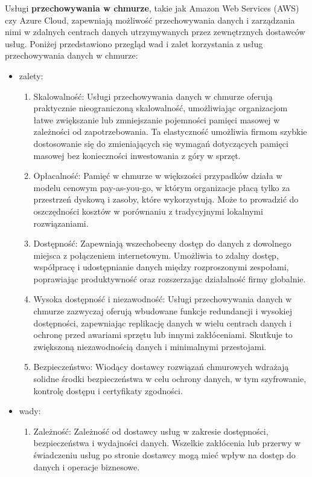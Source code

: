 \documentclass[12pt,a4paper,twoside]{article}
\begin{document}
Usługi \textbf{przechowywania w chmurze}, takie jak Amazon Web Services (AWS) czy Azure Cloud, zapewniają możliwość przechowywania danych i zarządzania nimi w zdalnych centrach danych utrzymywanych przez zewnętrznych dostawców usług. Poniżej przedstawiono przegląd wad i zalet korzystania z usług przechowywania danych w chmurze:
\begin{itemize}
	\item zalety:
		\begin{enumerate}
			\item Skalowalność: Usługi przechowywania danych w chmurze oferują praktycznie nieograniczoną skalowalność, umożliwiając organizacjom łatwe zwiększanie lub zmniejszanie pojemności pamięci masowej w zależności od zapotrzebowania. Ta elastyczność umożliwia firmom szybkie dostosowanie się do zmieniających się wymagań dotyczących pamięci masowej bez konieczności inwestowania z góry w sprzęt.
			\item Opłacalność: Pamięć w chmurze w większości przypadków działa w modelu cenowym pay-as-you-go, w którym organizacje płacą tylko za przestrzeń dyskową i zasoby, które wykorzystują. Może to prowadzić do oszczędności kosztów w porównaniu z tradycyjnymi lokalnymi rozwiązaniami.
			\item Dostępność: Zapewniają wszechobecny dostęp do danych z dowolnego miejsca z połączeniem internetowym. Umożliwia to zdalny dostęp, współpracę i udostępnianie danych między rozproszonymi zespołami, poprawiając produktywność oraz rozszerzając działalność firmy globalnie.
			\item Wysoka dostępność i niezawodność: Usługi przechowywania danych w chmurze zazwyczaj oferują wbudowane funkcje redundancji i wysokiej dostępności, zapewniając replikację danych w wielu centrach danych i ochronę przed awariami sprzętu lub innymi zakłóceniami. Skutkuje to zwiększoną niezawodnością danych i minimalnymi przestojami.
			\item Bezpieczeństwo: Wiodący dostawcy rozwiązań chmurowych wdrażają solidne środki bezpieczeństwa w celu ochrony danych, w tym szyfrowanie, kontrolę dostępu i certyfikaty zgodności.
		\end{enumerate}
	\item wady:
		\begin{enumerate}
			\item Zależność: Zależność od dostawcy usług w zakresie dostępności, bezpieczeństwa i wydajności danych. Wszelkie zakłócenia lub przerwy w świadczeniu usług po stronie dostawcy mogą mieć wpływ na dostęp do danych i operacje biznesowe.

\end{enumerate}
\end{itemize}
\end{document}
